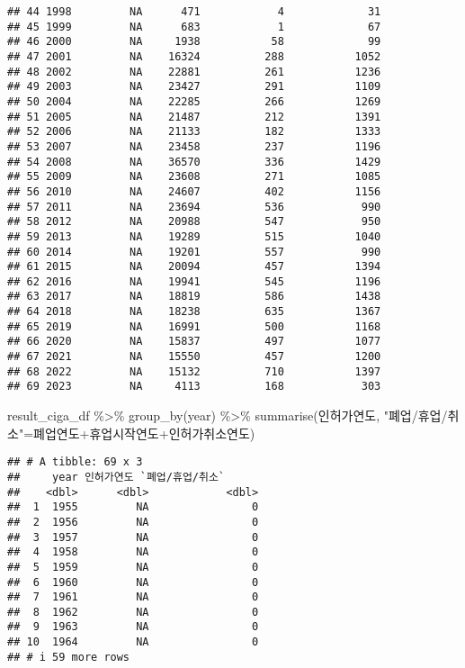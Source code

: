 \documentclass[
]{book}
\newenvironment{Shaded}{\begin{snugshade}}{\end{snugshade}}
\newcommand{\FunctionTok}[1]{\textcolor[rgb]{0.00,0.00,0.00}{#1}}
\newcommand{\NormalTok}[1]{#1}
\newcommand{\OtherTok}[1]{\textcolor[rgb]{0.56,0.35,0.01}{#1}}
\newcommand{\SpecialCharTok}[1]{\textcolor[rgb]{0.00,0.00,0.00}{#1}}
\newcommand{\StringTok}[1]{\textcolor[rgb]{0.31,0.60,0.02}{#1}}
\begin{document}
\begin{verbatim}
## 44 1998         NA      471            4             31
## 45 1999         NA      683            1             67
## 46 2000         NA     1938           58             99
## 47 2001         NA    16324          288           1052
## 48 2002         NA    22881          261           1236
## 49 2003         NA    23427          291           1109
## 50 2004         NA    22285          266           1269
## 51 2005         NA    21487          212           1391
## 52 2006         NA    21133          182           1333
## 53 2007         NA    23458          237           1196
## 54 2008         NA    36570          336           1429
## 55 2009         NA    23608          271           1085
## 56 2010         NA    24607          402           1156
## 57 2011         NA    23694          536            990
## 58 2012         NA    20988          547            950
## 59 2013         NA    19289          515           1040
## 60 2014         NA    19201          557            990
## 61 2015         NA    20094          457           1394
## 62 2016         NA    19941          545           1196
## 63 2017         NA    18819          586           1438
## 64 2018         NA    18238          635           1367
## 65 2019         NA    16991          500           1168
## 66 2020         NA    15837          497           1077
## 67 2021         NA    15550          457           1200
## 68 2022         NA    15132          710           1397
## 69 2023         NA     4113          168            303
\end{verbatim}

\begin{Shaded}
\begin{Highlighting}[]
\NormalTok{result\_ciga\_df }\SpecialCharTok{\%\textgreater{}\%} 
  \FunctionTok{group\_by}\NormalTok{(year) }\SpecialCharTok{\%\textgreater{}\%}
  \FunctionTok{summarise}\NormalTok{(인허가연도, }\StringTok{"폐업/휴업/취소"}\OtherTok{=}\NormalTok{폐업연도}\SpecialCharTok{+}\NormalTok{휴업시작연도}\SpecialCharTok{+}\NormalTok{인허가취소연도)}
\end{Highlighting}
\end{Shaded}

\begin{verbatim}
## # A tibble: 69 x 3
##     year 인허가연도 `폐업/휴업/취소`
##    <dbl>      <dbl>            <dbl>
##  1  1955         NA                0
##  2  1956         NA                0
##  3  1957         NA                0
##  4  1958         NA                0
##  5  1959         NA                0
##  6  1960         NA                0
##  7  1961         NA                0
##  8  1962         NA                0
##  9  1963         NA                0
## 10  1964         NA                0
## # i 59 more rows
\end{verbatim}

  
\end{document}

